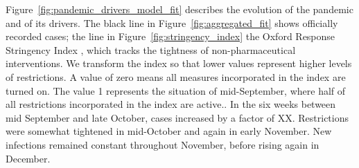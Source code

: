 Figure~\ref{fig:pandemic_drivers_model_fit} describes the evolution of the pandemic and
of its drivers. The black line in Figure~\ref{fig:aggregated_fit} shows officially
recorded cases; the  line in
Figure~\ref{fig:stringency_index} the Oxford Response Stringency Index \citep{Hale2020},
which tracks the tightness of non-pharmaceutical interventions. We transform the index
so that lower values represent higher levels of restrictions. A value of zero means all
measures incorporated in the index are turned on. The value 1 represents the situation
of mid-September, where half of all restrictions incorporated in the index are
active.. In the six weeks between mid September and late October, cases
increased by a factor of XX.
Restrictions were somewhat tightened in mid-October and again in early November. New
infections remained constant throughout November, before rising again in December.

